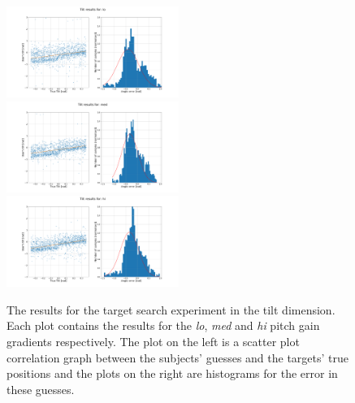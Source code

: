 \documentclass[format=sigconf, review=true, screen=true, anonymous=true]{acmart}
\begin{document}



\begin{figure}
  \centering
  \includegraphics[width=0.5\textwidth]{figures/tilt_err_lo.png}
  \includegraphics[width=0.5\textwidth]{figures/tilt_err_med.png}
  \includegraphics[width=0.5\textwidth]{figures/tilt_err_hi.png}
  \caption{The results for the target search experiment in the tilt dimension. Each plot contains the results for the \emph{lo}, \emph{med} and \emph{hi} pitch gain gradients respectively. The plot on the left is a scatter plot correlation graph between the subjects' guesses and the targets' true positions and the plots on the right are histograms for the error in these guesses. }
  \label{fig:tilt-err}
\end{figure}
\end{document}
